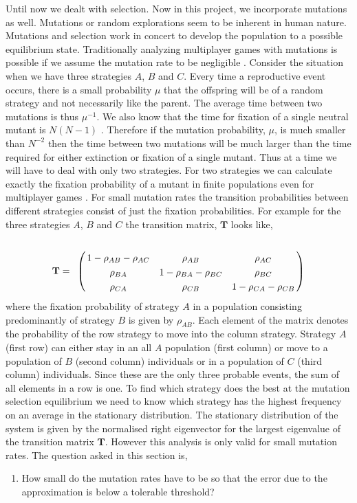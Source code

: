 \documentclass[oneside,11pt,a4paper]{book}
\begin{document}
Until now we dealt with selection.
Now in this project, we incorporate mutations as well.
Mutations or random explorations seem to be inherent in human nature.
Mutations and selection work in concert to develop the population to a possible equilibrium state.
Traditionally analyzing multiplayer games with mutations is possible if we assume the mutation rate to be negligible \citep{fudenberg:2008je}.
Consider the situation when we have three strategies $A$, $B$ and $C$.
Every time a reproductive event occurs, there is a small probability $\mu$ that the offspring will be of a random strategy and not necessarily like the parent.
The average time between two mutations is thus $\mu^{-1}$.
We also know that the time for fixation of a single neutral mutant is $N (N-1)$ \citep{antal:2006aa}.
Therefore if the mutation probability, $\mu$, is much smaller than $N^{-2}$ then the time between two mutations will be much larger than the time required for either extinction or fixation of a single mutant.
Thus at a time we will have to deal with only two strategies.
For two strategies we can calculate exactly the fixation probability of a mutant in finite populations \citep{nowak:2006bo} even for multiplayer games \citep{gokhale:2010pn}.
For small mutation rates the transition probabilities between different strategies consist of just the fixation probabilities.
For example for the three strategies $A$, $B$ and $C$ the transition matrix, $\mathbf{T}$ looks like,
%
\begin{align}
\mathbf{T}=
\bordermatrix{
&&&\cr
& 1-\rho_{AB}-\rho_{AC} & \rho_{AB} & \rho_{AC} \cr
& \rho_{BA} & 1-\rho_{BA}-\rho_{BC} & \rho_{BC} \cr
& \rho_{CA} & \rho_{CB} & 1-\rho_{CA}-\rho_{CB} \cr}
\end{align}
%
where the fixation probability of strategy $A$ in a population consisting predominantly of strategy $B$ is given by $\rho_{AB}$.
Each element of the matrix denotes the probability of the row strategy to move into the column strategy.
Strategy $A$ (first row) can either stay in an all $A$ population (first column) or move to a population of $B$ (second column) individuals or in a population of $C$ (third column) individuals.
Since these are the only three probable events, the sum of all elements in a row is one.
To find which strategy does the best at the mutation selection equilibrium we need to know which strategy has the highest frequency on an average in the stationary distribution.
The stationary distribution of the system is given by the normalised right eigenvector for the largest eigenvalue of the transition matrix $\mathbf{T}$.
However this analysis is only valid for small mutation rates.
The question asked in this section is,
\begin{enumerate}[-]
\item How small do the mutation rates have to be so that the error due to the approximation is below a tolerable threshold?
\end{enumerate}
\end{document}

